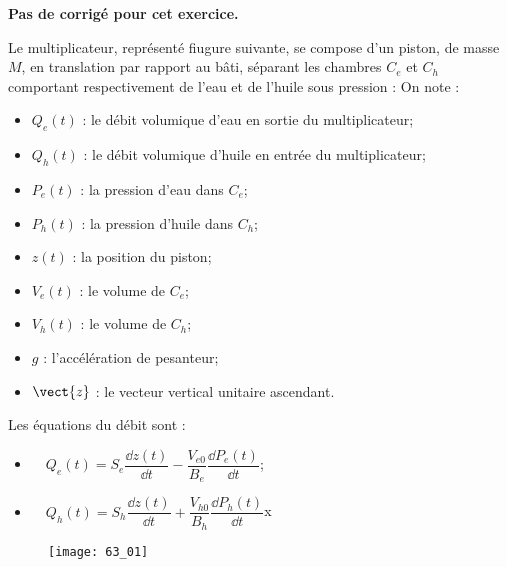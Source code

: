 \normaltrue
\correctionfalse


\setcounter{numques}{0}
\ifcorrection
\else
\textbf{Pas de corrigé pour cet exercice.}
\fi



Le multiplicateur, représenté fiugure suivante, se compose d’un piston, de masse $M$, en translation par rapport au bâti, séparant les chambres $C_e$ et $C_h$ comportant respectivement de l’eau et de l’huile sous pression :
On note :
\begin{itemize}
\item $Q_e(t)$ : le débit volumique d’eau en sortie du multiplicateur;
\item $Q_h(t)$ : le débit volumique d’huile en entrée du multiplicateur;
\item $P_e(t)$ : la pression d’eau dans $C_e$;
\item $P_h(t)$ : la pression d’huile dans $C_h$;
\item $z(t)$ : la position du piston;
\item $V_e(t)$ : le volume de $C_e$;
\item $V_h(t)$ : le volume de $C_h$;
\item $g$ : l’accélération de pesanteur;
\item $\vect{z}$ : le vecteur vertical unitaire ascendant.
\end{itemize}

Les équations du débit sont :
\begin{itemize}
\item $\quad Q_e (t)=S_e\dfrac{\dd z(t)}{\dd t}-\dfrac{V_{e0}}{B_e}  \dfrac{\dd P_e (t)}{\dd t}$;
\item $\quad Q_h (t)=S_h\dfrac{\dd z(t)}{\dd t}+\dfrac{V_{h0}}{B_h}  \dfrac{\dd P_h (t)}{\dd t}$x
\end{itemize}




\begin{figure}[H]
\centering
\texttt{[image: 63\_01]}
\end{figure}


%

